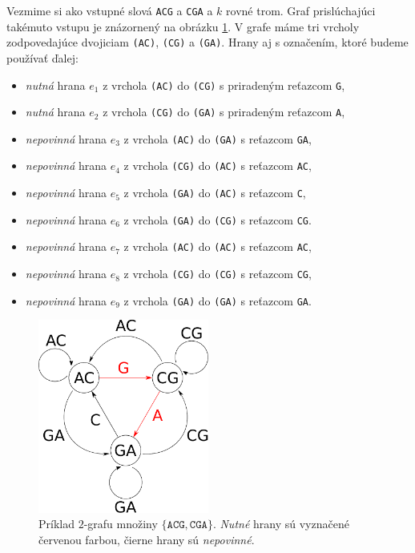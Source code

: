 Vezmime si ako vstupné slová \verb_ACG_ a \verb_CGA_ a $k$ rovné trom. Graf prislúchajúci
takémuto vstupu je znázornený na obrázku \ref{obr:graf}.
V grafe máme tri vrcholy zodpovedajúce dvojiciam \verb_(AC)_, \verb_(CG)_ a
\verb_(GA)_. Hrany aj s označením, ktoré budeme používať ďalej: 
\begin{itemize}
    \item \emph{nutná} hrana $e_1$ z vrchola \verb_(AC)_ do \verb_(CG)_ s priradeným reťazcom \verb_G_,
    \item \emph{nutná} hrana $e_2$ z vrchola \verb_(CG)_ do \verb_(GA)_ s priradeným reťazcom \verb_A_,
    \item \emph{nepovinná} hrana $e_3$ z vrchola \verb_(AC)_ do \verb_(GA)_ s reťazcom \verb_GA_,
    \item \emph{nepovinná} hrana $e_4$ z vrchola \verb_(CG)_ do \verb_(AC)_ s reťazcom \verb_AC_,
    \item \emph{nepovinná} hrana $e_5$ z vrchola \verb_(GA)_ do \verb_(AC)_ s reťazcom \verb_C_,
    \item \emph{nepovinná} hrana $e_6$ z vrchola \verb_(GA)_ do \verb_(CG)_ s reťazcom \verb_CG_.
    \item \emph{nepovinná} hrana $e_7$ z vrchola \verb_(AC)_ do \verb_(AC)_ s reťazcom \verb_AC_,
    \item \emph{nepovinná} hrana $e_8$ z vrchola \verb_(CG)_ do \verb_(CG)_ s reťazcom \verb_CG_,
    \item \emph{nepovinná} hrana $e_9$ z vrchola \verb_(GA)_ do \verb_(GA)_ s reťazcom \verb_GA_.
\end{itemize}

\begin{figure}

\centerline{\includegraphics[width=0.5\textwidth]{images/graph-2-1-3.pdf}}

\caption[Príklad grafu]{Príklad $2$-grafu množiny $\{\texttt{ACG}, \texttt{CGA} \}$. \emph{Nutné} hrany sú vyznačené
červenou farbou, čierne hrany sú \emph{nepovinné}.}

\label{obr:graf}

\end{figure}

